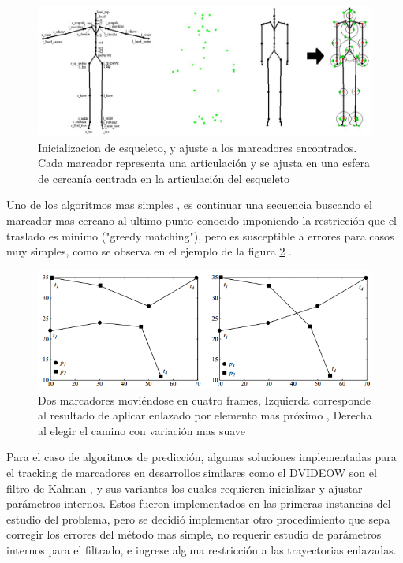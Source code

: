 \begin{figure}[hbt]
\begin{center}
\includegraphics[scale=0.5]{img/Tracking/01_skeleton_fitting_Herda.png}
\end{center}
\caption{Inicializacion de esqueleto, y ajuste a los marcadores encontrados. Cada marcador representa una articulación y se ajusta en una esfera de cercanía centrada en la articulación del esqueleto}
\label{skeleton_fitting_herda}
\end{figure}

Uno de los algoritmos mas simples \cite{survey_tracking}, es continuar una secuencia buscando el marcador mas cercano al ultimo punto conocido imponiendo la restricción que el traslado es mínimo ("greedy matching"), pero es susceptible a errores para casos muy simples, como se observa en el ejemplo de la figura \ref{greedy_matching} .

\begin{figure}[hbt]
\begin{center}
\includegraphics[scale=0.8]{img/Tracking/01_Greedy_Matching.png}
\end{center}
\caption{Dos marcadores moviéndose en cuatro frames, Izquierda corresponde al resultado de aplicar enlazado por elemento mas próximo \cite{survey_tracking} , Derecha al elegir el camino con variación mas suave}
\label{greedy_matching}
\end{figure}

Para el caso de algoritmos de predicción, algunas soluciones implementadas para el tracking de marcadores en desarrollos similares como el DVIDEOW \cite{figueroa2003flexible} son el filtro de Kalman \cite{kalman}, y sus variantes los cuales requieren inicializar y ajustar parámetros internos. Estos fueron implementados en las primeras instancias del estudio del problema, pero se decidió implementar otro procedimiento que sepa corregir los errores del método mas simple, no requerir estudio de parámetros internos para el filtrado, e ingrese alguna restricción a las trayectorias enlazadas.
\\ 

